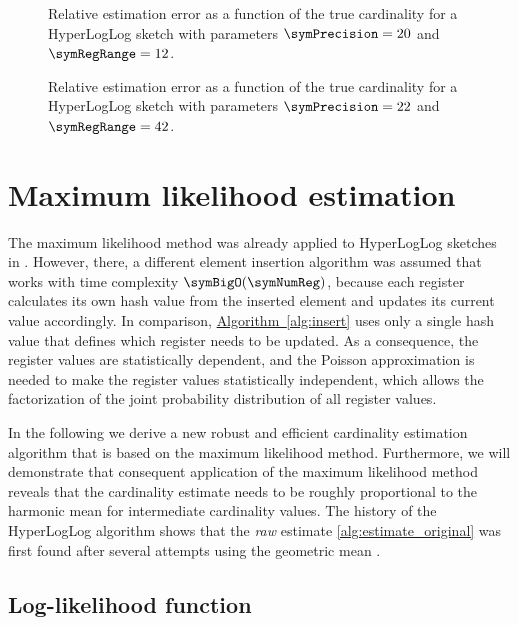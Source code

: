 \documentclass[a4paper]{scrartcl}
\newcommand*{\algoref}[1]{\hyperref[#1]{Algorithm~\ref*{#1}}}
\begin{document}
\begin{figure}
\centering

\caption{Relative estimation error as a function of the true cardinality for a HyperLogLog sketch with parameters $\symPrecision = 20$ and $\symRegRange=12$.}
\label{fig:raw_corrected_estimation_error_20_12}
\end{figure}

\begin{figure}
\centering

\caption{Relative estimation error as a function of the true cardinality for a HyperLogLog sketch with parameters $\symPrecision = 22$ and $\symRegRange=42$.}
\label{fig:raw_corrected_estimation_error_22_42}
\end{figure}


\section{Maximum likelihood estimation}

The maximum likelihood method was already applied to HyperLogLog sketches in \cite{Clifford2012}. However, there, a different element insertion algorithm was assumed that works with time complexity $\symBigO(\symNumReg)$, because each register calculates its own hash value from the inserted element and updates its current value accordingly. In comparison, \algoref{alg:insert} uses only a single hash value that defines which register needs to be updated. As a consequence, the register values are statistically dependent, and the Poisson approximation is needed to make the register values statistically independent, which allows the factorization of the joint probability distribution of all register values.

In the following we derive a new robust and efficient cardinality estimation algorithm that is based on the maximum likelihood method. Furthermore, we will demonstrate that consequent application of the maximum likelihood method reveals that the cardinality estimate needs to be roughly proportional to the harmonic mean for intermediate cardinality values. The history of the HyperLogLog algorithm shows that the \emph{raw} estimate \eqref{alg:estimate_original} was first found after several attempts using the geometric mean \cite{Flajolet2007, Durand2003}.

\subsection{Log-likelihood function}
\end{document}
